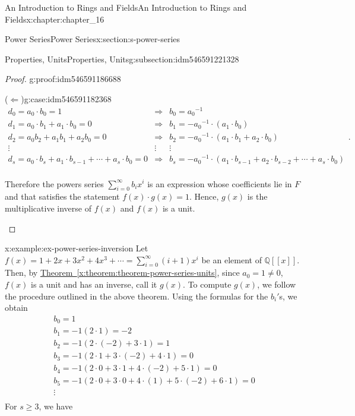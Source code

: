 \documentclass[oneside,10pt,]{book}
\newcommand{\xreffont}{\relax}
\newcommand{\backwardimplication}{($\Leftarrow$)}
\numberwithin{equation}{section}
\begin{document}
\begin{chapterptx}{An Introduction to Rings and Fields}{}{An Introduction to Rings and Fields}{}{}{x:chapter:chapter_16}
\begin{sectionptx}{Power Series}{}{Power Series}{}{}{x:section:s-power-series}
\begin{subsectionptx}{Properties, Units}{}{Properties, Units}{}{}{g:subsection:idm546591221328}
\begin{proof}{}{g:proof:idm546591186688}
\begin{case}{\backwardimplication}{}{g:case:idm546591182368}
\begin{equation*}
\begin{array}{lll}
d_0= a_0\cdot  b_0= 1 &\Rightarrow & b_0=a_0{}^{-1} \\
d_1= a_0\cdot b_1+ a_1\cdot b_0=0&\Rightarrow & b_1= -a_0{}^{-1}\cdot \left(a_1\cdot b_0\right) \\
d_2=a_0 b_2+a_1 b_1+a_2 b_0=0 & \Rightarrow & b_2=-a_0{}^{-1}\cdot \left(a_1\cdot b_1+ a_2\cdot b_0\right)\\
\vdots  & \vdots & \vdots \\
d_s= a_0\cdot b_s+ a_1\cdot b_{s-1}+ \cdots +a_s\cdot b_0 =0 &  \Rightarrow &b_s= -a_0{}^{-1}\cdot \left(a_1\cdot b_{s-1}+ a_2\cdot b_{s-2}+ \cdots +a_s\cdot b_0\right)\\
\end{array}\text{.}
\end{equation*}
%
\par
Therefore the powers series \(\sum_{i=0}^{\infty } b_i x^i\) is an expression whose coefficients lie in \(F\) and that satisfies the statement \(f(x)
\cdot  g(x) = 1\). Hence, \(g(x)\) is the multiplicative inverse of \(f(x)\) and \(f(x)\) is a unit.%
\end{case}
\end{proof}
\begin{example}{}{x:example:ex-power-series-inversion}%
Let \(f(x) =1 + 2x + 3 x^2+ 4 x^3+ \cdots =\sum_{i=0}^{\infty } (i+1) x^i\) be an element of \(\mathbb{Q}[[x]]\). Then, by \hyperref[x:theorem:theorem-power-series-units]{Theorem~{\xreffont\ref{x:theorem:theorem-power-series-units}}}, since \(a_0=1\neq 0\),  \(f(x)\) is a unit and has an inverse, call it \(g(x)\). To compute \(g(x)\), we follow the procedure outlined in the above theorem.  Using the formulas for the \(b_i'\)s, we obtain%
\begin{equation*}
\begin{array}{c}
b_0 = 1\\
b_1= -1(2\cdot 1)=-2\\
b_2= -1(2\cdot (-2)+ 3\cdot 1) = 1\\
b_3= -1(2\cdot 1 + 3\cdot (-2)+4\cdot 1)=0\\
b_4= -1(2\cdot 0+3\cdot 1 + 4\cdot (-2)+5\cdot 1)=0\\
b_5= -1(2\cdot 0+3\cdot 0+4\cdot (1)+5\cdot (-2)+6\cdot 1)=0\\
\vdots \\
\end{array}
\end{equation*}
For \(s \geq 3\), we have%

\end{example}
\end{subsectionptx}
\end{sectionptx}
\end{chapterptx}
\end{document}
